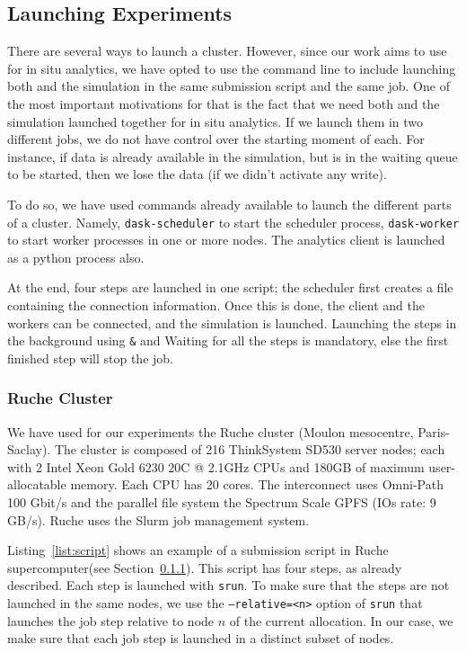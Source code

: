 \subsection{Launching Experiments}\label{sec:launch}
There are several ways to launch a \dask cluster. However, since our work aims to use \dask for in situ analytics, we have opted to use the command line to include launching both \dask and the simulation in the same submission script and the same job. 
One of the most important motivations for that is the fact that we need both \dask and the simulation launched together for in situ analytics. If we launch them in two different jobs, we do not have control over the starting moment of each. For instance, if data is already available in the simulation, but \dask is in the waiting queue to be started, then we lose the data (if we didn't activate any write). 

To do so, we have used commands already available to launch the different parts of a \dask cluster. Namely, \texttt{dask-scheduler} to start the scheduler process, \texttt{dask-worker} to start worker processes in one or more nodes. The analytics client is launched as a python process also.  

At the end, four steps are launched in one script; the scheduler first creates a file containing the connection information. Once this is done, the client and the workers can be connected, and the simulation is launched.  Launching the steps in the background using \texttt{\&} and Waiting for all the steps is mandatory, else the first finished step will stop the job. 



\subsubsection{Ruche Cluster}\label{sec:ruche}
We have used for our experiments the Ruche\cite{ruche} cluster (Moulon mesocentre, Paris-Saclay). The cluster is composed of 216 ThinkSystem SD530 server nodes; each with 2 Intel Xeon Gold 6230 20C @ 2.1GHz CPUs and 180GB of maximum user-allocatable memory. Each CPU has 20 cores. The interconnect uses Omni-Path 100 Gbit/s and the parallel file system the Spectrum Scale GPFS (IOs rate: 9 GB/s). 
Ruche uses the Slurm job management system.  

Listing~\ref{list:script} shows an example of a submission script in Ruche supercomputer(see Section~\ref{sec:ruche}). This script has four steps, as already described. Each step is launched with \texttt{srun}.
To make sure that the steps are not launched in the same nodes, we use the \texttt{--relative=<n>}\cite{slurm_relative} option of \texttt{srun} that launches the job step relative to node $n$ of the current allocation. In our case, we make sure that each job step is launched in a distinct subset of nodes.  

